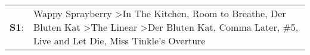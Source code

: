 \begin{supertabular}{p{0.03\textwidth}p{0.92\textwidth}}
 \textbf{S1}:  &  Wappy Sprayberry\textsuperscript{} \textgreater \enspace In The Kitchen\textsuperscript{}, \enspace Room to Breathe\textsuperscript{}, \enspace Der Bluten Kat\textsuperscript{} \textgreater \enspace The Linear\textsuperscript{} \textgreater \enspace Der Bluten Kat\textsuperscript{}, \enspace Comma Later\textsuperscript{}, \enspace \#5\textsuperscript{}, \enspace Live and Let Die\textsuperscript{}, \enspace Miss Tinkle's Overture\textsuperscript{}  \enspace  \\
\end{supertabular}
